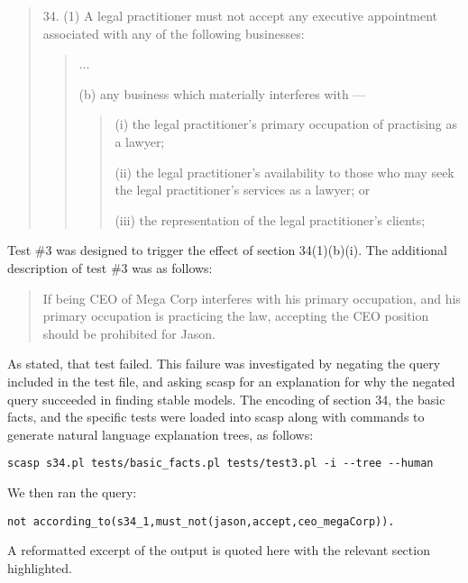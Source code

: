 \documentclass[sigconf]{acmart}
\begin{document}
\begin{quote}
    34. (1)  A legal practitioner must not accept any executive appointment associated with any of the following businesses:
    \begin{quote}
        ...
        
(b)	any business which materially interferes with —
\begin{quote}
    
(i)	the legal practitioner’s primary occupation of practising as a lawyer;

(ii)	the legal practitioner’s availability to those who may seek the legal practitioner’s services as a lawyer; or

(iii)	the representation of the legal practitioner’s clients;
\end{quote}
    \end{quote}
\end{quote}

Test \#3 was designed to trigger the effect of section 34(1)(b)(i). The additional description of test \#3 was as follows:

\begin{quote}
    If being CEO of Mega Corp interferes with his primary occupation,
    and his primary occupation is practicing the law, accepting the
    CEO position should be prohibited for Jason.
\end{quote}

As stated, that test failed. This failure was investigated by negating the query 
included in the test file, and asking scasp for an explanation for why the negated
query succeeded in finding stable models.
The encoding of
section 34, the basic facts, and the specific tests were loaded into scasp
along with commands to
generate natural language explanation trees, as follows:

\begin{lstlisting}
scasp s34.pl tests/basic_facts.pl tests/test3.pl -i --tree --human
\end{lstlisting}

We then ran the query:

\begin{lstlisting}
not according_to(s34_1,must_not(jason,accept,ceo_megaCorp)).
\end{lstlisting}

A reformatted excerpt of the output is quoted here with the relevant section
highlighted.
\end{document}
